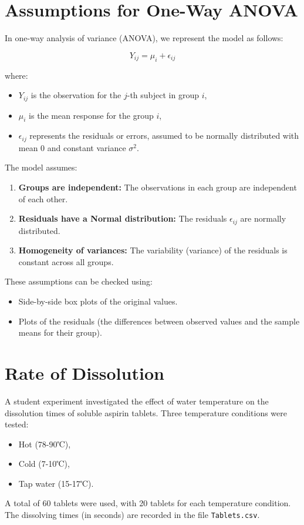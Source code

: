 \documentclass{article}
\begin{document}
\section*{Assumptions for One-Way ANOVA}

In one-way analysis of variance (ANOVA), we represent the model as follows:

\[
Y_{ij} = \mu_i + \epsilon_{ij}
\]

where:
\begin{itemize}
    \item \(Y_{ij}\) is the observation for the \(j\)-th subject in group \(i\),
    \item \(\mu_i\) is the mean response for the group \(i\),
    \item \(\epsilon_{ij}\) represents the residuals or errors, assumed to be normally distributed with mean 0 and constant variance \(\sigma^2\).
\end{itemize}

The model assumes:
\begin{enumerate}
    \item \textbf{Groups are independent:} The observations in each group are independent of each other.
    \item \textbf{Residuals have a Normal distribution:} The residuals \(\epsilon_{ij}\) are normally distributed.
    \item \textbf{Homogeneity of variances:} The variability (variance) of the residuals is constant across all groups.
\end{enumerate}

These assumptions can be checked using:
\begin{itemize}
    \item Side-by-side box plots of the original values.
    \item Plots of the residuals (the differences between observed values and the sample means for their group).
\end{itemize}

\section*{Rate of Dissolution}

A student experiment investigated the effect of water temperature on the dissolution times of soluble aspirin tablets. Three temperature conditions were tested:
\begin{itemize}
    \item Hot (78-90℃),
    \item Cold (7-10℃),
    \item Tap water (15-17℃).
\end{itemize}
A total of 60 tablets were used, with 20 tablets for each temperature condition. The dissolving times (in seconds) are recorded in the file \texttt{Tablets.csv}.
\end{document}
